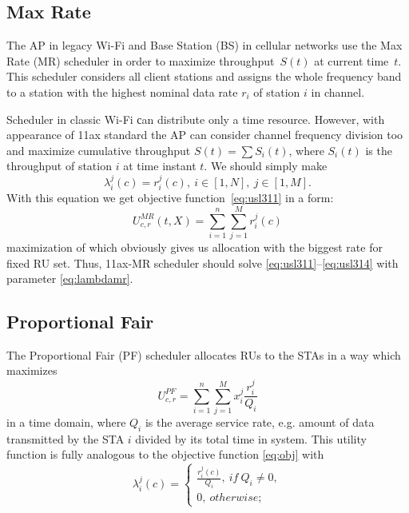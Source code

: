 \subsection{Max Rate}

The AP in legacy Wi-Fi and Base Station (BS) in cellular networks use the Max Rate (MR) scheduler in order to maximize  throughput~$S(t)$ at current time~$t$. This scheduler considers all client stations and assigns the whole frequency band to a station with the highest nominal data rate $r_i$ of station $i$ in channel.

Scheduler in classic Wi-Fi сan distribute only a time resource.
However, with appearance of 11ax standard the AP can consider channel frequency division too and maximize cumulative throughput $S(t) = \sum S_i(t)$, where $S_i(t)$ is the throughput of station $i$ at time instant $t$. We should simply make   
\begin{equation}
\label{eq:lambdamr}
\lambda_i^j (c) = r_i^j (c),\ i \in [1,N],\ j \in [1, M].
\end{equation}
With this equation we get objective function~\eqref{eq:usl311} in a form:
\begin{equation}
\label{eq:11axmrutility}
U^{MR}_{c,r}(t,X) = \sum_{i = 1}^{n} \sum_{j = 1}^{M} r_i^j (c)
\end{equation}
maximization of which obviously gives us allocation with the biggest rate for fixed RU set. Thus, 11ax-MR scheduler should solve \eqref{eq:usl311}--\eqref{eq:usl314} with parameter \eqref{eq:lambdamr}.

\subsection{Proportional Fair}

The Proportional Fair (PF) scheduler allocates RUs to the STAs in a way which maximizes 
\begin{equation}
\label{eq:11axpfutility}
U_{c,r}^{PF} = \sum_{i=1}^{n}\sum_{j=1}^{M} x_i^j \frac{r_i^j}{Q_i}
\end{equation}
in a time domain, where $Q_i$ is the average service rate, e.g. amount of data transmitted by the STA $i$ divided by its total time in system. This utility function is fully analogous to the objective function \eqref{eq:obj} with
\begin{equation}
\label{eq:pflambda}
\lambda_i^j (c) = \begin{cases}
\frac{r_i^j(c)}{Q_i},\ if\ Q_i \ne 0,\\
0,\ otherwise;
\end{cases}
\end{equation}

